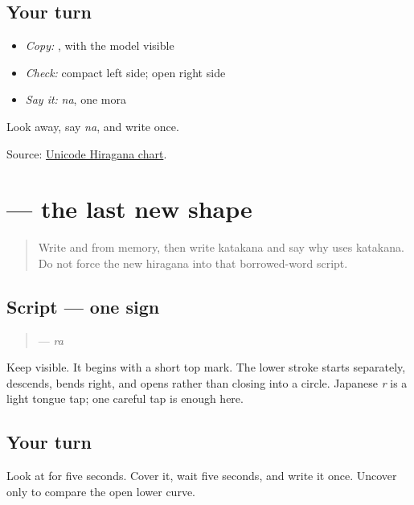 \subsection*{Your turn}
\begin{itemize}
\raggedright
  \item \emph{Copy:} \textbf{}, with the model visible
  \item \emph{Check:} compact left side; open right side
  \item \emph{Say it:} \emph{na}, one mora
\end{itemize}

\begin{tcolorbox}[breakable,colback=teal!4,colframe=teal!35!black,title={Before you move on}]
Look away, say \emph{na}, and write \textbf{} once.

Source: \href{https://www.unicode.org/charts/PDF/U3040.pdf}{Unicode Hiragana chart}.
\end{tcolorbox}
\section[\texorpdfstring{\ja{ら} (ra)}{ら (ra)}]{ — the last new shape}

\label{lesson:JA-W08-ra}



\begin{quote}
Write \textbf{} and \textbf{} from memory, then write katakana \textbf{} and say why \textbf{} uses katakana. Do not force the new hiragana into that borrowed-word script.
\end{quote}

\subsection*{Script — one sign}

\begin{quote}
\textbf{} — \emph{ra}
\end{quote}

Keep \textbf{} visible. It begins with a short top mark. The lower stroke starts separately, descends, bends right, and opens rather than closing into a circle. Japanese \emph{r} is a light tongue tap; one careful tap is enough here.

\subsection*{Your turn}
Look at \textbf{} for five seconds. Cover it, wait five seconds, and write it once. Uncover only to compare the open lower curve.

